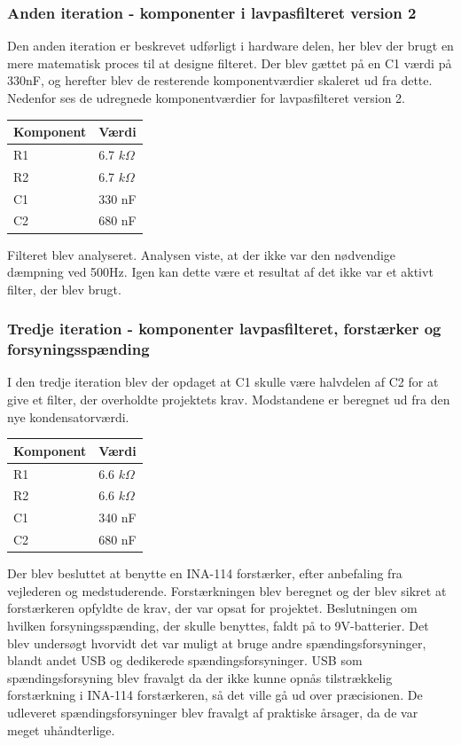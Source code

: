 \subsubsection{Anden iteration - komponenter i lavpasfilteret version 2}
Den anden iteration er beskrevet udførligt i hardware delen, her blev der brugt en mere matematisk proces til at designe filteret. Der blev gættet på en C1 værdi på 330nF, og herefter blev de resterende komponentværdier skaleret ud fra dette. Nedenfor ses de udregnede komponentværdier for lavpasfilteret version 2.
\begin{table}[H]
\begin{tabular}{| l | l |}
   \hline
   Komponent & Værdi\\ \hline
   R1 & 6.7 $k\Omega$ \\ \hline
   R2 & 6.7 $k\Omega$ \\ \hline
   C1 & 330 nF\\\hline
   C2 & 680 nF\\\hline
\end{tabular}
\end{table}
Filteret blev analyseret. Analysen viste, at der ikke var den nødvendige dæmpning ved 500Hz. Igen kan dette være et resultat af det ikke var et aktivt filter, der blev brugt. 
\subsubsection{Tredje iteration - komponenter lavpasfilteret, forstærker og forsyningsspænding}
I den tredje iteration blev der opdaget at C1 skulle være halvdelen af C2 for at give et filter, der overholdte projektets krav. Modstandene er beregnet ud fra den nye kondensatorværdi.
\begin{table}[H]
\begin{tabular}{| l | l |}
   \hline
   Komponent & Værdi\\ \hline
   R1 & 6.6 $k\Omega$ \\ \hline
   R2 & 6.6 $k\Omega$ \\ \hline
   C1 & 340 nF\\\hline
   C2 & 680 nF\\\hline
\end{tabular}
\end{table}
Der blev besluttet at benytte en INA-114 forstærker, efter anbefaling fra vejlederen og medstuderende. Forstærkningen blev beregnet og der blev sikret at forstærkeren opfyldte de krav, der var opsat for projektet. Beslutningen om hvilken forsyningsspænding, der skulle benyttes, faldt på to 9V-batterier. Det blev undersøgt hvorvidt det var muligt at bruge andre spændingsforsyninger, blandt andet USB og dedikerede spændingsforsyninger. USB som spændingsforsyning blev fravalgt da der ikke kunne opnås tilstrækkelig forstærkning i INA-114 forstærkeren, så det ville gå ud over præcisionen. De udleveret spændingsforsyninger blev fravalgt af praktiske årsager, da de var meget uhåndterlige.
